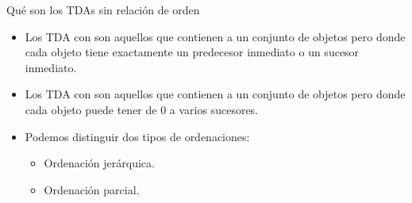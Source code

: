 \documentclass[10pt,envcountsect,spanish]{beamer}
\begin{document}
\begin{frame}{Qué son los TDAs sin relación de orden}

\begin{itemize}%

\item Los TDA con  son aquellos que contienen a un conjunto de objetos pero donde cada objeto tiene exactamente un predecesor inmediato o un sucesor inmediato. 

\item Los TDA con  son aquellos que contienen a un conjunto de objetos pero donde cada objeto puede tener de 0 a varios sucesores.  

\item Podemos distinguir dos tipos de ordenaciones:

\begin{itemize}
\item Ordenación jerárquica.
\item Ordenación parcial.
\end{itemize}

\end{itemize}
\end{frame}
\end{document}
